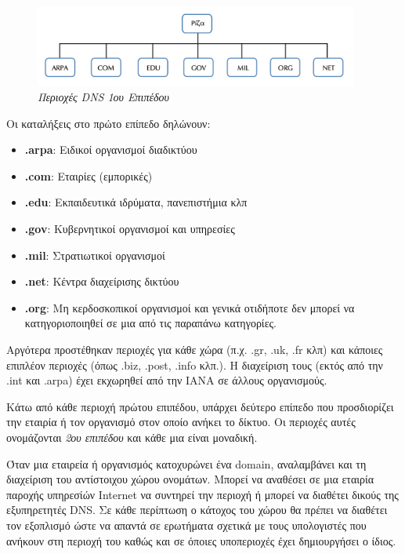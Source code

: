 \begin{figure}[!ht]
  \centering
  \includegraphics[width=0.95\textwidth]{images/chapter6/6-1}
  \caption {\textsl{Περιοχές DNS 1ου Επιπέδου}}
  \label{6-1}
\end{figure}

Οι καταλήξεις στο πρώτο επίπεδο δηλώνουν:

\begin{itemize}
\item \textbf{.arpa}: Ειδικοί οργανισμοί διαδικτύου
\item \textbf{.com}: Εταιρίες (εμπορικές)
\item \textbf{.edu}: Εκπαιδευτικά ιδρύματα, πανεπιστήμια κλπ
\item \textbf{.gov}: Κυβερνητικοί οργανισμοί και υπηρεσίες
\item \textbf{.mil}: Στρατιωτικοί οργανισμοί
\item \textbf{.net}: Κέντρα διαχείρισης δικτύου
\item \textbf{.org}: Μη κερδοσκοπικοί οργανισμοί και γενικά οτιδήποτε δεν μπορεί να κατηγοριοποιηθεί σε μια από τις παραπάνω κατηγορίες.
\end{itemize}

Αργότερα προστέθηκαν περιοχές για κάθε χώρα (π.χ. .gr, .uk, .fr κλπ) και κάποιες επιπλέον περιοχές (όπως .biz, .post, .info κλπ.). Η διαχείριση τους (εκτός από την .int και .arpa) έχει εκχωρηθεί από την IANA σε άλλους οργανισμούς.

Κάτω από κάθε περιοχή πρώτου επιπέδου, υπάρχει δεύτερο επίπεδο που προσδιορίζει την εταιρία ή τον οργανισμό στον οποίο ανήκει το δίκτυο. Οι περιοχές αυτές ονομάζονται \emph{2ου επιπέδου} και κάθε μια είναι μοναδική. 

Όταν μια εταιρεία ή οργανισμός κατοχυρώνει ένα domain, αναλαμβάνει και τη διαχείριση του αντίστοιχου χώρου ονομάτων. Μπορεί να αναθέσει σε μια εταιρία παροχής υπηρεσίών Internet να συντηρεί την περιοχή ή μπορεί να διαθέτει δικούς της εξυπηρετητές DNS. Σε κάθε περίπτωση ο κάτοχος του χώρου θα πρέπει να διαθέτει τον εξοπλισμό ώστε να απαντά σε ερωτήματα σχετικά με τους υπολογιστές που ανήκουν στη περιοχή του καθώς και σε όποιες υποπεριοχές έχει δημιουργήσει ο ίδιος.

